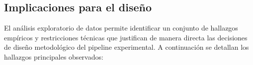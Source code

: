 
\subsection{Implicaciones para el diseño}
\label{sec:implicaciones_diseno}

El análisis exploratorio de datos permite identificar un conjunto de
hallazgos empíricos y restricciones técnicas que justifican de manera
directa las decisiones de diseño metodológico del pipeline experimental.
A continuación se detallan los hallazgos principales observados:

